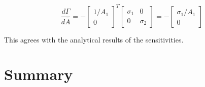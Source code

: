 \begin{equation}
    \frac{d \Gamma}{d \bar{A}} = 
    -\begin{bmatrix}
    1/A_1 \\
    0
    \end{bmatrix}^T
    \begin{bmatrix}
    \sigma_1 & 0 \\
    0 & \sigma_2
    \end{bmatrix} =
    -
    \begin{bmatrix}
    \sigma_1 / A_1 \\
    0
    \end{bmatrix}
\end{equation}

This agrees with the analytical results of the sensitivities. 




\section{Summary}
